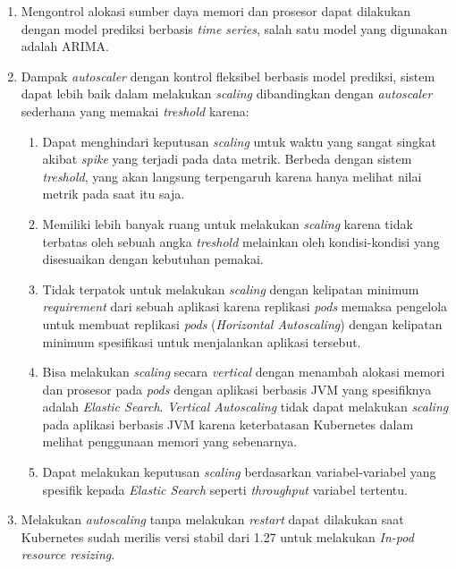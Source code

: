 \begin{enumerate}
    \item Mengontrol alokasi sumber daya memori dan prosesor dapat dilakukan dengan model prediksi berbasis \textit{time series}, salah satu model yang digunakan adalah ARIMA.
    \item Dampak \textit{autoscaler} dengan kontrol fleksibel berbasis model prediksi, sistem dapat lebih baik dalam melakukan \textit{scaling} dibandingkan dengan \textit{autoscaler} sederhana yang memakai \textit{treshold} karena:

        \begin{enumerate}
            \item Dapat menghindari keputusan \textit{scaling} untuk waktu yang sangat singkat akibat \textit{spike} yang terjadi pada data metrik. Berbeda dengan sistem \textit{treshold}, yang akan langsung terpengaruh karena hanya melihat nilai metrik pada saat itu saja.
            \item Memiliki lebih banyak ruang untuk melakukan \textit{scaling} karena tidak terbatas oleh sebuah angka \textit{treshold} melainkan oleh kondisi-kondisi yang disesuaikan dengan kebutuhan pemakai.
            \item Tidak terpatok untuk melakukan \textit{scaling} dengan kelipatan minimum \textit{requirement} dari sebuah aplikasi karena replikasi \textit{pods} memaksa pengelola untuk membuat replikasi \textit{pods} (\textit{Horizontal Autoscaling}) dengan kelipatan minimum spesifikasi untuk menjalankan aplikasi tersebut.
            \item Bisa melakukan \textit{scaling} secara \textit{vertical} dengan menambah alokasi memori dan prosesor pada \textit{pods} dengan aplikasi berbasis JVM yang spesifiknya adalah \textit{Elastic Search}. \textit{Vertical Autoscaling} tidak dapat melakukan \textit{scaling} pada aplikasi berbasis JVM karena keterbatasan Kubernetes dalam melihat penggunaan memori yang sebenarnya.
            \item Dapat melakukan keputusan \textit{scaling} berdasarkan variabel-variabel yang spesifik kepada \textit{Elastic Search} seperti \textit{throughput} variabel tertentu.
        \end{enumerate}

    \item Melakukan \textit{autoscaling} tanpa melakukan \textit{restart} dapat dilakukan saat Kubernetes sudah merilis versi stabil dari 1.27 untuk melakukan \textit{In-pod resource resizing}.
\end{enumerate}

